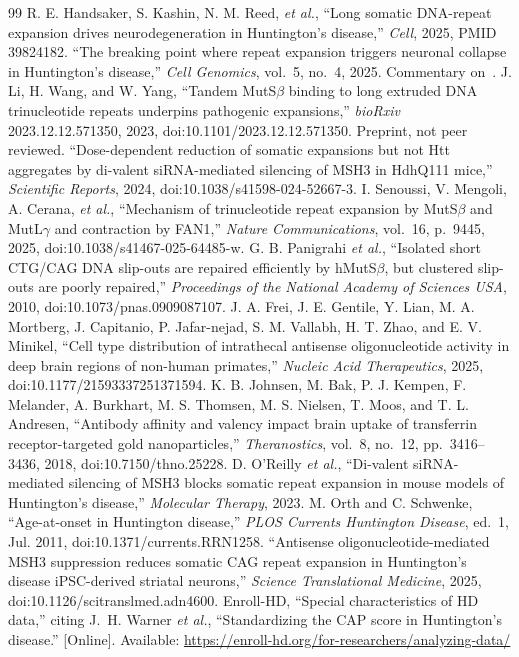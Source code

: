 \documentclass[conference]{IEEEtran}
\begin{document}
\balance
\begin{thebibliography}{99}
 R. E. Handsaker, S. Kashin, N. M. Reed, \emph{et al.}, ``Long somatic DNA-repeat expansion drives neurodegeneration in Huntington's disease,'' \emph{Cell}, 2025, PMID 39824182.
 ``The breaking point where repeat expansion triggers neuronal collapse in Huntington's disease,'' \emph{Cell Genomics}, vol.~5, no.~4, 2025. Commentary on~\cite{handsaker}.
 J. Li, H. Wang, and W. Yang, ``Tandem MutS$\beta$ binding to long extruded DNA trinucleotide repeats underpins pathogenic expansions,'' \emph{bioRxiv} 2023.12.12.571350, 2023, doi:10.1101/2023.12.12.571350. Preprint, not peer reviewed.
 ``Dose-dependent reduction of somatic expansions but not Htt aggregates by di-valent siRNA-mediated silencing of MSH3 in HdhQ111 mice,'' \emph{Scientific Reports}, 2024, doi:10.1038/s41598-024-52667-3.
 I. Senoussi, V. Mengoli, A. Cerana, \emph{et al.}, ``Mechanism of trinucleotide repeat expansion by MutS$\beta$ and MutL$\gamma$ and contraction by FAN1,'' \emph{Nature Communications}, vol.~16, p.~9445, 2025, doi:10.1038/s41467-025-64485-w.
 G. B. Panigrahi \emph{et al.}, ``Isolated short CTG/CAG DNA slip-outs are repaired efficiently by hMutS$\beta$, but clustered slip-outs are poorly repaired,'' \emph{Proceedings of the National Academy of Sciences USA}, 2010, doi:10.1073/pnas.0909087107.
 J. A. Frei, J. E. Gentile, Y. Lian, M. A. Mortberg, J. Capitanio, P. Jafar-nejad, S. M. Vallabh, H. T. Zhao, and E. V. Minikel, ``Cell type distribution of intrathecal antisense oligonucleotide activity in deep brain regions of non-human primates,'' \emph{Nucleic Acid Therapeutics}, 2025, doi:10.1177/21593337251371594.
 K. B. Johnsen, M. Bak, P. J. Kempen, F. Melander, A. Burkhart, M. S. Thomsen, M. S. Nielsen, T. Moos, and T. L. Andresen, ``Antibody affinity and valency impact brain uptake of transferrin receptor-targeted gold nanoparticles,'' \emph{Theranostics}, vol.~8, no.~12, pp.~3416--3436, 2018, doi:10.7150/thno.25228.
 D. O'Reilly \emph{et al.}, ``Di-valent siRNA-mediated silencing of MSH3 blocks somatic repeat expansion in mouse models of Huntington's disease,'' \emph{Molecular Therapy}, 2023.
 M. Orth and C. Schwenke, ``Age-at-onset in Huntington disease,'' \emph{PLOS Currents Huntington Disease}, ed.~1, Jul. 2011, doi:10.1371/currents.RRN1258.
 ``Antisense oligonucleotide-mediated MSH3 suppression reduces somatic CAG repeat expansion in Huntington's disease iPSC-derived striatal neurons,'' \emph{Science Translational Medicine}, 2025, doi:10.1126/scitranslmed.adn4600.
 Enroll-HD, ``Special characteristics of HD data,'' citing J.~H. Warner \emph{et al.}, ``Standardizing the CAP score in Huntington's disease.'' [Online]. Available: \url{https://enroll-hd.org/for-researchers/analyzing-data/}
\end{thebibliography}
\end{document}
